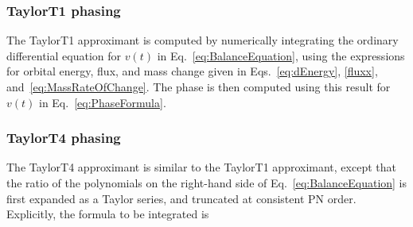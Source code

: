 \subsubsection{TaylorT1 phasing}
The TaylorT1 approximant is computed by numerically integrating the
ordinary differential equation for $v(t)$ in
Eq.~\eqref{eq:BalanceEquation}, using the expressions for orbital
energy, flux, and mass change given in Eqs.~\eqref{eq:dEnergy},
\eqref{fluxx}, and~\eqref{eq:MassRateOfChange}.  The phase is then
computed using this result for $v(t)$ in Eq.~\eqref{eq:PhaseFormula}.

\subsubsection{TaylorT4 phasing}
The TaylorT4 approximant is similar to the TaylorT1 approximant,
except that the ratio of the polynomials on the right-hand side of
Eq.~\eqref{eq:BalanceEquation} is first expanded as a Taylor series,
and truncated at consistent PN order.  Explicitly, the formula to be
integrated is
